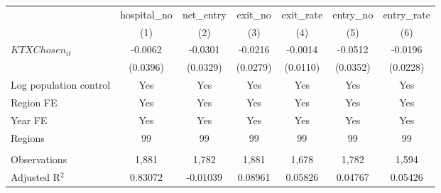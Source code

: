 \begingroup
\centering
\begin{tabular}{lcccccc}
   \toprule
                          & hospital\_no  & net\_entry  & exit\_no  & exit\_rate  & entry\_no  & entry\_rate \\    
                          & (1)           & (2)         & (3)       & (4)         & (5)        & (6)\\  
   \midrule 
   $KTXChosen_{it}$       & -0.0062       & -0.0301     & -0.0216   & -0.0014     & -0.0512    & -0.0196\\   
                          & (0.0396)      & (0.0329)    & (0.0279)  & (0.0110)    & (0.0352)   & (0.0228)\\   
   Log population control & Yes           & Yes         & Yes       & Yes         & Yes        & Yes\\  
   Region FE              & Yes           & Yes         & Yes       & Yes         & Yes        & Yes\\  
   Year FE                & Yes           & Yes         & Yes       & Yes         & Yes        & Yes\\  
   Regions                & 99            & 99          & 99        & 99          & 99         & 99\\  
    \\
   Observations           & 1,881         & 1,782       & 1,881     & 1,678       & 1,782      & 1,594\\  
   Adjusted R$^2$         & 0.83072       & -0.01039    & 0.08961   & 0.05826     & 0.04767    & 0.05426\\  
   \bottomrule
\end{tabular}
\par\endgroup
